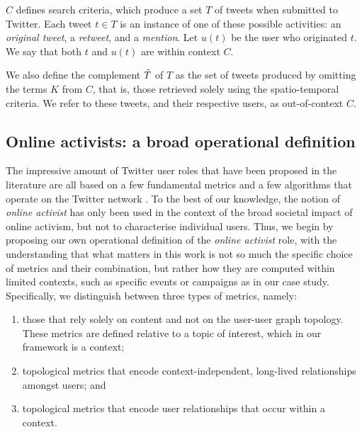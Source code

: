 \documentclass[runningheads]{llncs}
\begin{document}
$C$ defines search criteria, which produce a set $T$ of tweets when submitted to Twitter.
Each tweet $t \in T$ is an instance of one of these possible activities: an \textit{original tweet}, a \textit{retweet}, and a \textit{mention}. 
Let $u(t)$ be the user who originated $t$.
We say that both $t$ and  $u(t)$ are within context $C$.

We also define the complement $\Tilde{T}$ of $T$ as the set of tweets produced by omitting the terms $K$ from $C$, that is, those retrieved solely using the spatio-temporal criteria. 
We refer to these tweets, and their respective users, as out-of-context $C$.


\subsection{Online activists: a broad operational definition}


The impressive amount of  Twitter user roles that have been proposed in the literature are all based on a few fundamental metrics and a few algorithms that operate on the Twitter network \cite{RIQUELME2016949}.
To the best of our knowledge, the notion of \textit{online activist} has only been used in the context of the broad societal impact of online activism, but not to characterise  individual users.
Thus, we begin by proposing our own operational definition of the \textit{online activist} role, with the understanding that what matters in this work is not so much the specific choice of metrics and their combination, but rather how they are computed within limited contexts, such as specific events or campaigns as in our case study.
Specifically, we distinguish between three types of metrics, namely:
\begin{enumerate}
\item those that rely solely on content and not on the user-user graph topology. These metrics are defined relative to a topic of interest, which in our framework is a context;
\item topological metrics that encode context-independent, long-lived relationships amongst users; and 
\item topological metrics that encode user relationships that occur within a context.
\end{enumerate}
\end{document}
